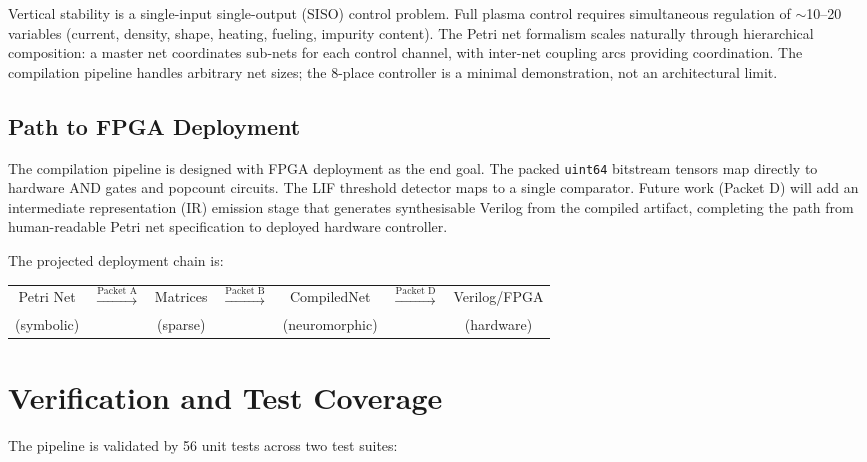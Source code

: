 \documentclass[12pt]{article}
\newcommand{\code}[1]{\texttt{#1}}
\begin{document}
Vertical stability is a single-input single-output (SISO) control
problem.  Full plasma control requires simultaneous regulation of
$\sim$10--20 variables (current, density, shape, heating, fueling,
impurity content).  The Petri net formalism scales naturally through
hierarchical composition: a master net coordinates sub-nets for each
control channel, with inter-net coupling arcs providing coordination.
The compilation pipeline handles arbitrary net sizes; the 8-place
controller is a minimal demonstration, not an architectural limit.

\subsection{Path to FPGA Deployment}

The compilation pipeline is designed with FPGA deployment as the
end goal.  The packed \code{uint64} bitstream tensors map directly to
hardware AND gates and popcount circuits.  The LIF threshold detector
maps to a single comparator.  Future work (Packet D) will add an
intermediate representation (IR) emission stage that generates
synthesisable Verilog from the compiled artifact, completing the path
from human-readable Petri net specification to deployed hardware
controller.

The projected deployment chain is:
\begin{center}
\begin{tabular}{ccccccc}
Petri Net & $\xrightarrow{\text{Packet A}}$ &
Matrices & $\xrightarrow{\text{Packet B}}$ &
CompiledNet & $\xrightarrow{\text{Packet D}}$ &
Verilog/FPGA \\
(symbolic) & & (sparse) & & (neuromorphic) & & (hardware)
\end{tabular}
\end{center}


\section{Verification and Test Coverage}
\label{sec:verification}

The pipeline is validated by 56 unit tests across two test suites:
\end{document}
